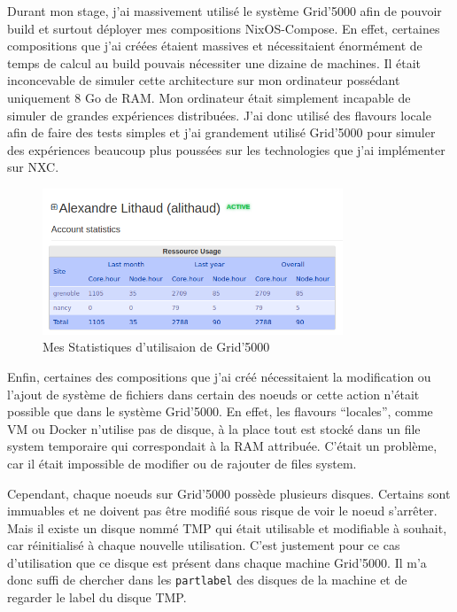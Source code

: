 \documentclass[a4paper,french,12pt, titlepage]{article}
\begin{document}
Durant mon stage, j'ai massivement utilisé le système Grid'5000 afin de
pouvoir build et surtout déployer mes compositions NixOS-Compose. En
effet, certaines compositions que j'ai créées étaient massives et
nécessitaient énormément de temps de calcul au build pouvais nécessiter
une dizaine de machines. Il était inconcevable de simuler cette
architecture sur mon ordinateur possédant uniquement 8 Go de RAM. Mon
ordinateur était simplement incapable de simuler de grandes expériences
distribuées. J'ai donc utilisé des flavours locale afin de faire des
tests simples et j'ai grandement utilisé Grid'5000 pour simuler des
expériences beaucoup plus poussées sur les technologies que j'ai
implémenter sur NXC.\newline

\begin{figure}[h]
\centering
\includegraphics[width=0.8\textwidth,height=0.8\textheight,keepaspectratio]{images/statg5k.png}
\caption{Mes Statistiques d'utilisaion de Grid'5000}
\end{figure}

Enfin, certaines des compositions que j'ai créé nécessitaient la
modification ou l'ajout de système de fichiers dans certain des noeuds
or cette action n'était possible que dans le système Grid'5000. En
effet, les flavours ``locales'', comme VM ou Docker n'utilise pas de
disque, à la place tout est stocké dans un file system temporaire qui
correspondait à la RAM attribuée. C'était un problème, car il était
impossible de modifier ou de rajouter de files system.

Cependant, chaque noeuds sur Grid'5000 possède plusieurs disques.
Certains sont immuables et ne doivent pas être modifié sous risque de
voir le noeud s'arrêter. Mais il existe un disque nommé TMP qui était
utilisable et modifiable à souhait, car réinitialisé à chaque nouvelle
utilisation. C'est justement pour ce cas d'utilisation que ce disque est
présent dans chaque machine Grid'5000. Il m'a donc suffi de chercher
dans les \texttt{partlabel} des disques de la machine et de regarder le
label du disque TMP.\newline
\end{document}
